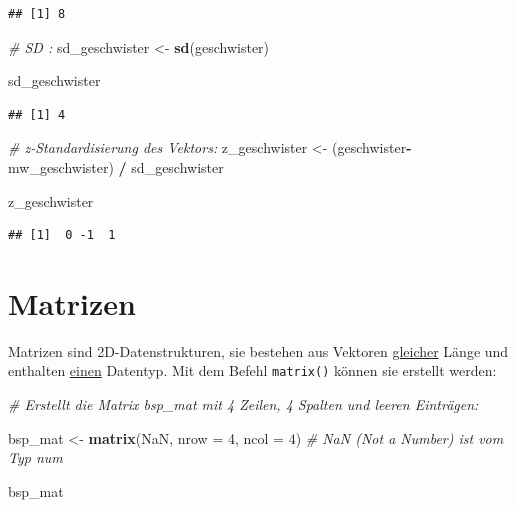 \documentclass[
  ngerman,
]{book}
\newenvironment{Shaded}{\begin{snugshade}}{\end{snugshade}}
\newcommand{\AttributeTok}[1]{\textcolor[rgb]{0.13,0.29,0.53}{#1}}
\newcommand{\CommentTok}[1]{\textcolor[rgb]{0.56,0.35,0.01}{\textit{#1}}}
\newcommand{\ConstantTok}[1]{\textcolor[rgb]{0.56,0.35,0.01}{#1}}
\newcommand{\DecValTok}[1]{\textcolor[rgb]{0.00,0.00,0.81}{#1}}
\newcommand{\FunctionTok}[1]{\textcolor[rgb]{0.13,0.29,0.53}{\textbf{#1}}}
\newcommand{\NormalTok}[1]{#1}
\newcommand{\OtherTok}[1]{\textcolor[rgb]{0.56,0.35,0.01}{#1}}
\newcommand{\SpecialCharTok}[1]{\textcolor[rgb]{0.81,0.36,0.00}{\textbf{#1}}}
\begin{document}
\begin{verbatim}
## [1] 8
\end{verbatim}

\begin{Shaded}
\begin{Highlighting}[]
\CommentTok{\# SD :}
\NormalTok{sd\_geschwister }\OtherTok{\textless{}{-}} \FunctionTok{sd}\NormalTok{(geschwister)}

\NormalTok{sd\_geschwister}
\end{Highlighting}
\end{Shaded}

\begin{verbatim}
## [1] 4
\end{verbatim}

\begin{Shaded}
\begin{Highlighting}[]
\CommentTok{\# z{-}Standardisierung des Vektors:}
\NormalTok{z\_geschwister }\OtherTok{\textless{}{-}}\NormalTok{ (geschwister}\SpecialCharTok{{-}}\NormalTok{mw\_geschwister) }\SpecialCharTok{/}\NormalTok{ sd\_geschwister}

\NormalTok{z\_geschwister}
\end{Highlighting}
\end{Shaded}

\begin{verbatim}
## [1]  0 -1  1
\end{verbatim}

\section{Matrizen}\label{matrizen}

Matrizen sind 2D-Datenstrukturen, sie bestehen aus Vektoren \ul{gleicher} Länge und enthalten \ul{einen} Datentyp. Mit dem
Befehl \texttt{matrix()} können sie erstellt werden:

\begin{Shaded}
\begin{Highlighting}[]
\CommentTok{\# Erstellt die Matrix bsp\_mat mit 4 Zeilen, 4 Spalten und leeren Einträgen: }

\NormalTok{bsp\_mat }\OtherTok{\textless{}{-}} \FunctionTok{matrix}\NormalTok{(}\ConstantTok{NaN}\NormalTok{, }\AttributeTok{nrow =} \DecValTok{4}\NormalTok{, }\AttributeTok{ncol =} \DecValTok{4}\NormalTok{) }\CommentTok{\# NaN (Not a Number) ist vom Typ \textasciigrave{}num\textasciigrave{}}

\NormalTok{bsp\_mat}
\end{Highlighting}
\end{Shaded}
\end{document}
